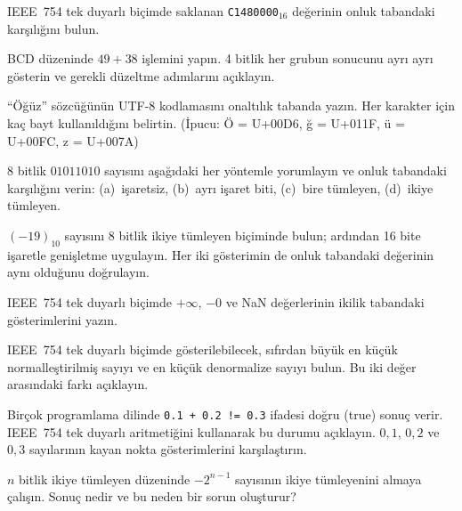 \begin{alistirma}[\orta]
IEEE~754 tek duyarlı biçimde saklanan \texttt{C1480000}$_{16}$ değerinin onluk tabandaki karşılığını bulun.
\end{alistirma}

\begin{alistirma}[\orta]
BCD düzeninde $49 + 38$ işlemini yapın. 4 bitlik her grubun sonucunu ayrı ayrı gösterin ve gerekli düzeltme adımlarını açıklayın.
\end{alistirma}

\begin{alistirma}[\orta]
``Öğüz'' sözcüğünün UTF-8 kodlamasını onaltılık tabanda yazın. Her karakter için kaç bayt kullanıldığını belirtin. (İpucu: Ö = U+00D6, ğ = U+011F, ü = U+00FC, z = U+007A)
\end{alistirma}

\begin{alistirma}[\orta]
8 bitlik $01011010$ sayısını aşağıdaki her yöntemle yorumlayın ve onluk tabandaki karşılığını verin: (a)~işaretsiz, (b)~ayrı işaret biti, (c)~bire tümleyen, (d)~ikiye tümleyen.
\end{alistirma}

\begin{alistirma}[\orta]
$(-19)_{10}$ sayısını 8 bitlik ikiye tümleyen biçiminde bulun; ardından 16 bite işaretle genişletme uygulayın. Her iki gösterimin de onluk tabandaki değerinin aynı olduğunu doğrulayın.
\end{alistirma}

\begin{alistirma}[\zor]
IEEE~754 tek duyarlı biçimde $+\infty$, $-0$ ve NaN değerlerinin ikilik tabandaki gösterimlerini yazın.
\end{alistirma}

\begin{alistirma}[\zor]
IEEE~754 tek duyarlı biçimde gösterilebilecek, sıfırdan büyük en küçük normalleştirilmiş sayıyı ve en küçük denormalize sayıyı bulun. Bu iki değer arasındaki farkı açıklayın.
\end{alistirma}

\begin{alistirma}[\zor]
Birçok programlama dilinde \texttt{0.1 + 0.2 != 0.3} ifadesi doğru (true) sonuç verir. IEEE~754 tek duyarlı aritmetiğini kullanarak bu durumu açıklayın. $0{,}1$, $0{,}2$ ve $0{,}3$ sayılarının kayan nokta gösterimlerini karşılaştırın.
\end{alistirma}

\begin{alistirma}[\zor]
$n$ bitlik ikiye tümleyen düzeninde $-2^{n-1}$ sayısının ikiye tümleyenini almaya çalışın. Sonuç nedir ve bu neden bir sorun oluşturur?
\end{alistirma}
